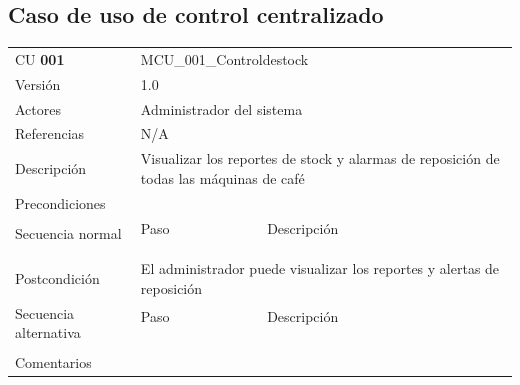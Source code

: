 \documentclass[a4paper,10pt]{extarticle}
\begin{document}
    

    

    

    

    \subsection{Caso de uso de control centralizado}
        \noindent\begin{tabularx}{\textwidth}{|l|l|l|}
            \cline{1-3}
            CU \textbf{001} & \multicolumn{2}{p{12cm}|}{MCU\_001\_Controldestock} \\ \cline{1-3}
            Versión & \multicolumn{2}{p{12cm}|}{1.0}  \\ \cline{1-3}
            Actores & \multicolumn{2}{p{12cm}|}{Administrador del sistema} \\ \cline{1-3}
            Referencias & \multicolumn{2}{p{12cm}|}{N/A} \\ \cline{1-3}
            Descripción & \multicolumn{2}{p{12cm}|}{Visualizar los reportes de stock y alarmas de reposición de todas las máquinas de café} \\ \cline{1-3}
            Precondiciones & \multicolumn{2}{p{12cm}|}{} \\ \cline{1-3}
            \multirow{3}{*}{Secuencia normal} & Paso & Descripción \\ \cline{2-3}
            &  & \\
            &  & \\
            &  & \\ \cline{1-3}
            Postcondición & \multicolumn{2}{p{12cm}|}{El administrador puede visualizar los reportes y alertas de reposición} \\ \cline{1-3}
            \multirow{3}{*}{Secuencia alternativa} & Paso & Descripción \\ \cline{2-3}
            & & \\
            & & \\
            & & \\ \cline{1-3}
            Comentarios & \multicolumn{2}{p{12cm}|}{} \\ \cline{1-3}
          \end{tabularx}
\end{document}
